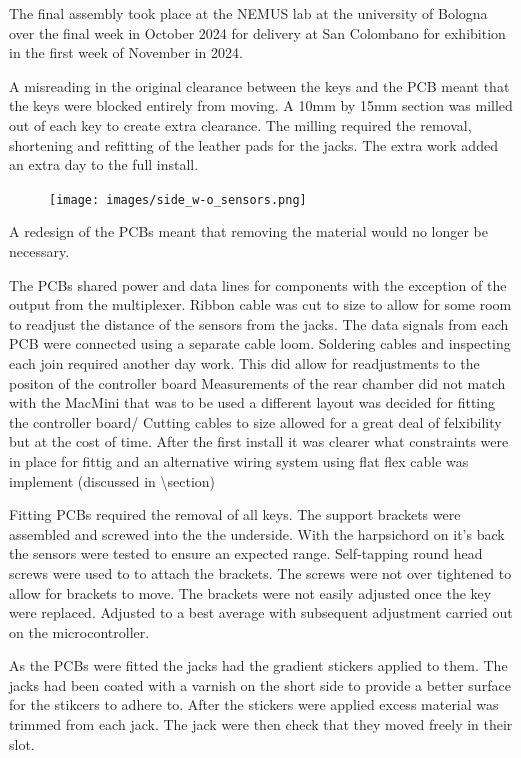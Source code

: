 The final assembly took place at the NEMUS lab at the university of
Bologna over the final week in October 2024 for delivery at San
Colombano for exhibition in the first week of November in 2024.

A misreading in the original clearance between the keys and the PCB
meant that the keys were blocked entirely from moving. A 10mm by 15mm
section was milled out of each key to create extra
clearance. The milling required the removal, shortening and refitting of
the leather pads for the jacks. The extra work
added an extra day to the full install.

\begin{figure}  
  \centering
  \texttt{[image: images/side\_w-o\_sensors.png]} 
  \caption{} 
  \Description{} 
  \label{fig:3key}
\end{figure}

A redesign of the PCBs meant that removing the material would no longer
be necessary.

The PCBs shared power and data lines for components with the exception
of the output from the multiplexer. Ribbon cable was cut to size to
allow for some room to readjust the distance of the sensors from the
jacks. The data signals from each PCB were connected using a separate
cable loom. Soldering cables and inspecting each join required another
day work. This did allow for readjustments to the positon of the
controller board Measurements of the rear chamber did not match with the
MacMini that was to be used a different layout was decided for fitting
the controller board/ Cutting cables to size allowed for a great deal of
felxibility but at the cost of time. After the first install it was
clearer what constraints were in place for fittig and an alternative
wiring system using flat flex cable was implement (discussed in
\textbackslash section)

Fitting PCBs required the removal of all keys. The support brackets were
assembled and screwed into the the underside. With the harpsichord on
it's back the sensors were tested to ensure an expected range.
Self-tapping round head screws were used to to attach the brackets. The
screws were not over tightened to allow for brackets to move. The
brackets were not easily adjusted once the key were replaced. Adjusted
to a best average with subsequent adjustment carried out on the
microcontroller.

As the PCBs were fitted the jacks had the gradient stickers applied to
them. The jacks had been coated with a varnish on the short side to
provide a better surface for the stikcers to adhere to. After the
stickers were applied excess material was trimmed from each jack. The
jack were then check that they moved freely in their slot.

